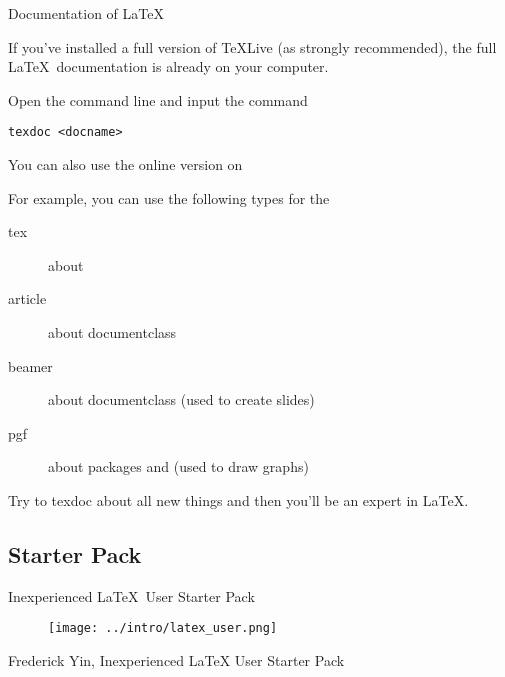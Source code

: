 \begin{frame}[fragile]{Documentation of \LaTeX}

    If you've installed a full version of \TeX Live (as strongly recommended), the full \LaTeX\ documentation is already on your computer. \medskip

    Open the command line and input the command

    \begin{verbatim}
texdoc <docname>
    \end{verbatim}

    You can also use the online version on  \medskip

    For example, you can use the following types for the 
    \begin{description}
        \item[tex] 		about \structure{\TeX}
        \item[article] 	about documentclass 
        \item[beamer] 	about documentclass  (used to create slides)
        \item[pgf]		about packages  and  (used to draw graphs)
    \end{description}
    \smallskip
    Try to \alert{texdoc} about all new things and then you'll be an expert in \LaTeX.
\end{frame}

\subsection*{Starter Pack}

\begin{frame}{Inexperienced \LaTeX\  User Starter Pack}
    \begin{figure}[h]
        \centering
        \texttt{[image: ../intro/latex\_user.png]}
    \end{figure}
    \tiny{Frederick Yin, Inexperienced LaTeX User Starter Pack}
\end{frame}
